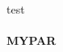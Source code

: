\documentclass{book}
\newcommand{\donothing}[1]{#1}
\newcommand{\mypar}{\paragraph{MYPAR}}
\begin{document}
\donothing{test}
\mypar
\blindtext
\end{document}
